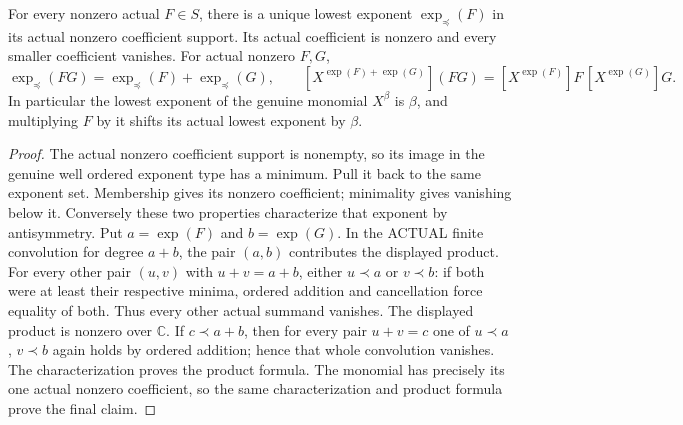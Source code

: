 \begin{lemma}
\label{hir:actual-formal-initial-exponent-coefficient-product}
For every nonzero actual $F\in S$, there is a unique lowest exponent
$\exp_\preceq(F)$ in its actual nonzero coefficient support. Its actual
coefficient is nonzero and every smaller coefficient vanishes. For actual
nonzero $F,G$,
\[
 \exp_\preceq(FG)=\exp_\preceq(F)+\exp_\preceq(G),\qquad
 [X^{\exp(F)+\exp(G)}](FG)
 =[X^{\exp(F)}]F\,[X^{\exp(G)}]G.
\]
In particular the lowest exponent of the genuine monomial $X^\beta$ is
$\beta$, and multiplying $F$ by it shifts its actual lowest exponent by
$\beta$.
\leanok
\end{lemma}
\begin{proof}
The actual nonzero coefficient support is nonempty, so its image in the
genuine well ordered exponent type has a minimum. Pull it back to the
same exponent set. Membership gives its nonzero coefficient; minimality
gives vanishing below it. Conversely these two properties characterize
that exponent by antisymmetry.
Put $a=\exp(F)$ and $b=\exp(G)$. In the ACTUAL finite convolution
for degree $a+b$, the pair $(a,b)$ contributes the displayed product.
For every other pair $(u,v)$ with $u+v=a+b$, either $u\prec a$ or
$v\prec b$: if both were at least their respective minima, ordered
addition and cancellation force equality of both. Thus every other
actual summand vanishes. The displayed product is nonzero over
$\mathbb C$. If $c\prec a+b$, then for every pair $u+v=c$ one of
$u\prec a$, $v\prec b$ again holds by ordered addition; hence that
whole convolution vanishes. The characterization proves the product
formula. The monomial has precisely its one actual nonzero coefficient,
so the same characterization and product formula prove the final claim.
\end{proof}

